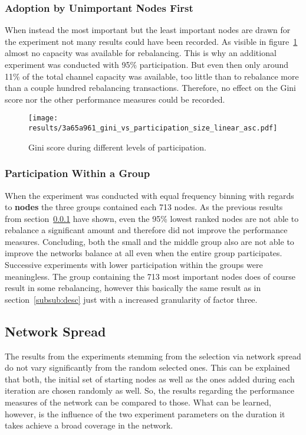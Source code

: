 \documentclass[final]{fhnwreport}       %
\begin{document}
\subsubsection{Adoption by Unimportant Nodes First}\label{subsub:asc}
When instead the most important but the least important nodes are drawn for the experiment not many results could have been recorded. As visible in figure~\ref{fig:gini_part_size_linear_asc} almost no capacity was available for rebalancing. This is why an additional experiment was conducted with 95\% participation. But even then only around 11\% of the total channel capacity was available, too little than to rebalance more than a couple hundred rebalancing transactions. Therefore, no effect on the Gini score nor the other performance measures could be recorded. 

\begin{figure}[htp]
\centering
\texttt{[image: results/3a65a961\_gini\_vs\_participation\_size\_linear\_asc.pdf]}
\caption{Gini score during different levels of participation.}
\label{fig:gini_part_size_linear_asc}
\end{figure}

\subsubsection{Participation Within a Group}
When the experiment was conducted with equal frequency binning with regards to \textbf{nodes} the three groups contained each 713 nodes. As the previous results from section~\ref{subsub:asc} have shown, even the 95\% lowest ranked nodes are not able to rebalance a significant amount and therefore did not improve the performance measures. Concluding, both the small and the middle group also are not able to improve the networks balance at all even when the entire group participates. Successive experiments with lower participation within the groups were meaningless. The group containing the 713 most important nodes does of course result in some rebalancing, however this basically the same result as in section~\ref{subsub:desc} just with a increased granularity of factor three.

\subsection{Network Spread}
The results from the experiments stemming from the selection via network spread do not vary significantly from the random selected ones. This can be explained that both, the initial set of starting nodes as well as the ones added during each iteration are chosen randomly as well. So, the results regarding the performance measures of the network can be compared to those. What can be learned, however, is the influence of the two experiment parameters on the duration it takes achieve a broad coverage in the network.
\end{document}
